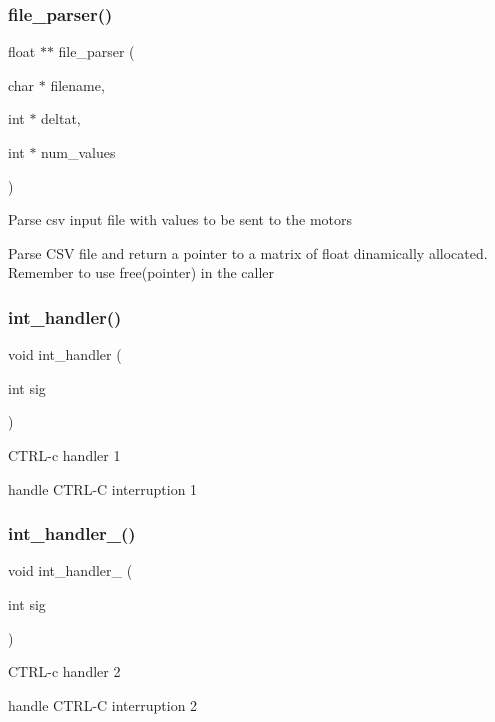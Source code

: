 \subsubsection{file\+\_\+parser()}
{\footnotesize\ttfamily float $\ast$$\ast$ file\+\_\+parser (\begin{DoxyParamCaption}\item[{char $\ast$}]{filename,  }\item[{int $\ast$}]{deltat,  }\item[{int $\ast$}]{num\+\_\+values }\end{DoxyParamCaption})}

Parse csv input file with values to be sent to the motors

Parse C\+SV file and return a pointer to a matrix of float dinamically allocated. Remember to use free(pointer) in the caller \mbox{\label{qbadmin_8c_aa2bbc30ab4adea656f93d184270b0463}} 
\subsubsection{int\+\_\+handler()}
{\footnotesize\ttfamily void int\+\_\+handler (\begin{DoxyParamCaption}\item[{int}]{sig }\end{DoxyParamCaption})}

C\+T\+R\+L-\/c handler 1

handle C\+T\+R\+L-\/C interruption 1 \mbox{\label{qbadmin_8c_aaa3f1dc84f95d8979c957bb2d9c6df18}} 
\subsubsection{int\+\_\+handler\+\_()}
{\footnotesize\ttfamily void int\+\_\+handler\+\_ (\begin{DoxyParamCaption}\item[{int}]{sig }\end{DoxyParamCaption})}

C\+T\+R\+L-\/c handler 2

handle C\+T\+R\+L-\/C interruption 2 \mbox{\label{qbadmin_8c_affb492a4714b7e7b8047971581fd9aab}} 
